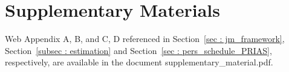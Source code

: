 \documentclass[useAMS,usenatbib, referee]{biom}
\begin{document}
\backmatter





\section*{Supplementary Materials}

Web Appendix A, B, and C, D referenced in Section~\ref{sec : jm_framework}, Section~\ref{subsec : estimation} and Section~\ref{sec : pers_schedule_PRIAS}, respectively, are available in the document supplementary\_material.pdf.\vspace*{-8pt}



%
%   
% 

 


\appendix
\end{document}
